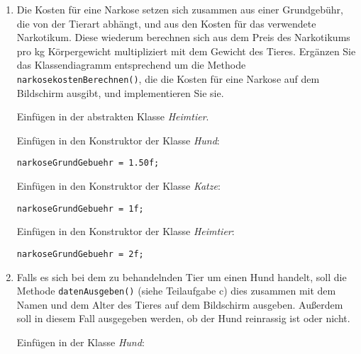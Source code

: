 \documentclass{lehramt-informatik-haupt}
\begin{document}
\begin{enumerate}

\item Die Kosten für eine Narkose setzen sich zusammen aus einer
Grundgebühr, die von der Tierart abhängt, und aus den Kosten für das
verwendete Narkotikum. Diese wiederum berechnen sich aus dem Preis des
Narkotikums pro kg Körpergewicht multipliziert mit dem Gewicht des
Tieres. Ergänzen Sie das Klassendiagramm entsprechend um die Methode
\verb|narkosekostenBerechnen()|, die die Kosten für eine Narkose auf dem
Bildschirm ausgibt, und implementieren Sie sie.


\begin{antwort}
Einfügen in der abstrakten Klasse \emph{Heimtier}.


Einfügen in den Konstruktor der Klasse \emph{Hund}:
\begin{verbatim}
narkoseGrundGebuehr = 1.50f;
\end{verbatim}

Einfügen in den Konstruktor der Klasse \emph{Katze}:
\begin{verbatim}
narkoseGrundGebuehr = 1f;
\end{verbatim}

Einfügen in den Konstruktor der Klasse \emph{Heimtier}:
\begin{verbatim}
narkoseGrundGebuehr = 2f;
\end{verbatim}
\end{antwort}


\item Falls es sich bei dem zu behandelnden Tier um einen Hund handelt,
soll die Methode \verb|datenAusgeben()| (siehe Teilaufgabe c) dies
zusammen mit dem Namen und dem Alter des Tieres auf dem Bildschirm
ausgeben. Außerdem soll in diesem Fall ausgegeben werden, ob der Hund
reinrassig ist oder nicht.

\begin{antwort}
Einfügen in der Klasse \emph{Hund}:

\end{antwort}
\end{enumerate}
\end{document}

